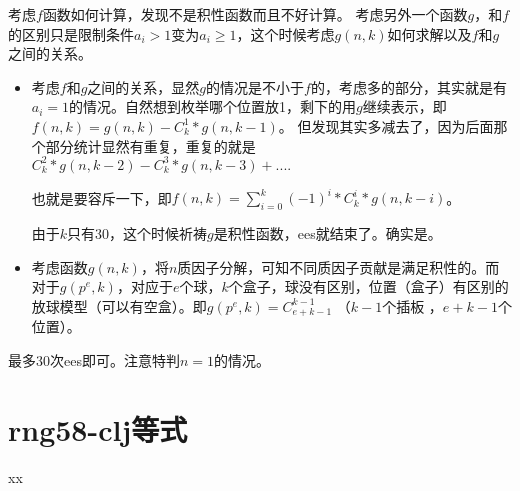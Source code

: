 \begin{solution}
	考虑$f$函数如何计算，发现不是积性函数而且不好计算。
	考虑另外一个函数$g$，和$f$的区别只是限制条件$a_i>1$变为$a_i\ge 1$，这个时候考虑$g(n,k)$如何求解以及$f$和$g$之间的关系。
	\begin{itemize}
		\item 考虑$f$和$g$之间的关系，显然$g$的情况是不小于$f$的，考虑多的部分，其实就是有$a_i=1$的情况。自然想到枚举哪个位置放1，剩下的用$g$继续表示，即$f(n,k) = g(n,k) - C_k^1*g(n,k-1)$。 但发现其实多减去了，因为后面那个部分统计显然有重复，重复的就是$C_k^2*g(n,k-2) - C_k^3*g(n,k-3)+....$   
		
		也就是要容斥一下，即$f(n,k) = \sum_{i=0}^k(-1)^i*C_k^i*g(n,k-i)$。  
		
		由于$k$只有30，这个时候祈祷$g$是积性函数，ees就结束了。确实是。
		\item 考虑函数$g(n,k)$，将$n$质因子分解，可知{\heiti 不同质因子贡献是满足积性的}。而对于$g(p^e,k)$，对应于$e$个球，$k$个盒子，球没有区别，位置（盒子）有区别的放球模型（可以有空盒）。即$g(p^e,k) = C_{e+k-1}^{k-1}$  （$k-1$个插板 ，$e+k-1$个位置）。
	\end{itemize}
	
	最多30次ees即可。注意特判$n=1$的情况。
\end{solution}





\section{rng58-clj等式}



\begin{problemset}
	\item xx
\end{problemset}